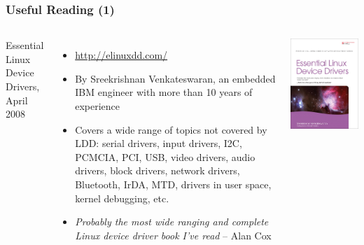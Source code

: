 \begin{frame}
  \frametitle{Useful Reading (1)}
  \begin{columns}
    Essential Linux Device Drivers, April 2008
    \begin{itemize}
    \item \url{http://elinuxdd.com/}
    \item By Sreekrishnan Venkateswaran, an embedded IBM engineer
      with more than 10 years of experience
    \item Covers a wide range of topics not covered by LDD: serial
      drivers, input drivers, I2C, PCMCIA, PCI,
      USB, video drivers, audio drivers, block drivers, network
      drivers, Bluetooth, IrDA, MTD, drivers in user space, kernel
      debugging, etc.
    \item \emph{Probably the most wide ranging and complete Linux
          device driver book I've read} -- Alan Cox
    \end{itemize}
    \includegraphics[width=\textwidth]{slides/kernel-resources-references/eldd.jpg}
  \end{columns}
\end{frame}

